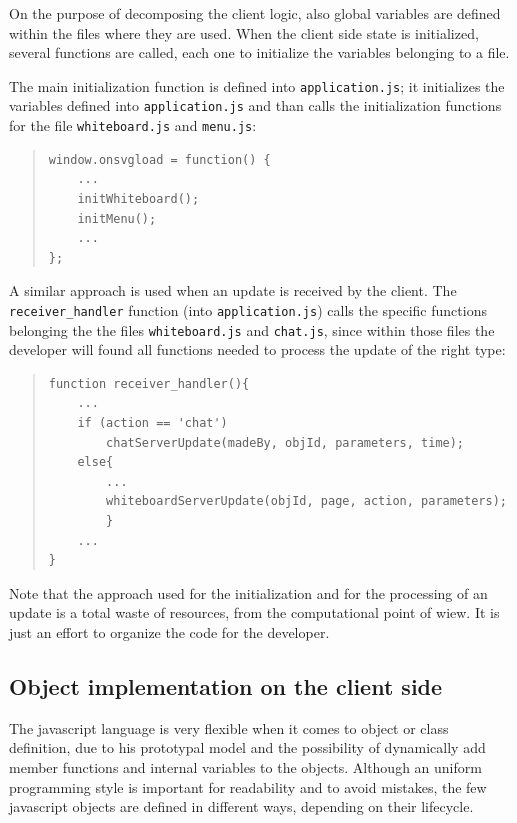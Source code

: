 \documentclass[10pt,a4paper,english]{book}
\begin{document}
On the purpose of decomposing the client logic, also global variables
are defined within the files where they are used. When the client side
state is initialized, several functions are called, each one to
initialize the variables belonging to a file.

The main initialization function is defined into \texttt{application.js};
it initializes the variables defined into \texttt{application.js} and than
calls the initialization functions for the file \texttt{whiteboard.js} and
\texttt{menu.js}:
\begin{quote}\begin{verbatim}
window.onsvgload = function() {
    ...
    initWhiteboard();
    initMenu();
    ...
};
\end{verbatim}
\end{quote}

A similar approach is used when an update is received by the
client. The \texttt{receiver{\_}handler} function (into \texttt{application.js})
calls the specific functions belonging the the files \texttt{whiteboard.js}
and \texttt{chat.js}, since within those files the developer will found all
functions needed to process the update of the right type:
\begin{quote}\begin{verbatim}
function receiver_handler(){
    ...
    if (action == 'chat')
        chatServerUpdate(madeBy, objId, parameters, time);
    else{
        ...
        whiteboardServerUpdate(objId, page, action, parameters);
        }
    ...
}
\end{verbatim}
\end{quote}

Note that the approach used for the initialization and for the
processing of an update is a total waste of resources, from the
computational point of wiew. It is just an effort to organize the code
for the developer.



\hypertarget{object-implementation-on-the-client-side}{}
\subsection{Object implementation on the client side}
\label{object-implementation-on-the-client-side}

The javascript language is very flexible when it comes to object or
class definition, due to his prototypal model and the possibility of
dynamically add member functions and internal variables to the
objects. Although an uniform programming style is important for
readability and to avoid mistakes, the few javascript objects are
defined in different ways, depending on their lifecycle.
\end{document}
